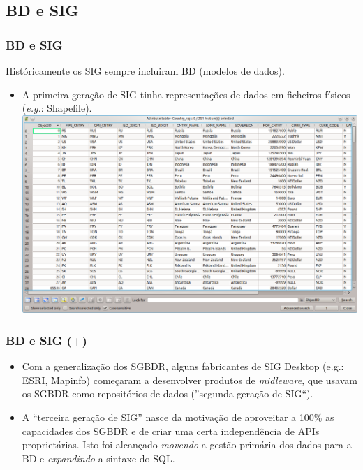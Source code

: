 \documentclass[hyperref={pdfpagelabels=true}]{beamer}
\begin{document}
\subsection{BD e SIG} 
\begin{frame}
\frametitle{BD e SIG}
Hist\'{o}ricamente os SIG sempre incluiram BD (modelos de dados).
    \begin{itemize}
      \item<2-> A primeira gera\c{c}\~{a}o de SIG tinha representa\c{c}\~{o}es de dados em ficheiros f\'{i}sicos (\textit{e.g.}: Shapefile).      
      \includegraphics[scale=0.2]{att_table.png}
      \end{itemize}
\end{frame}

\begin{frame}
\frametitle{BD e SIG (+)}
    \begin{itemize}
      \item<1-> Com a generaliza\c{c}\~{a}o dos SGBDR, alguns fabricantes de SIG Desktop (e.g.: ESRI, Mapinfo) come\c{c}aram a desenvolver produtos de \textit{midleware}, que usavam os SGBDR como reposit\'{o}rios de dados (''segunda gera\c{c}\~{a}o de SIG``).
      \item<2-> A ``terceira gera\c{c}\~{a}o de SIG'' nasce da motiva\c{c}\~{a}o de aproveitar a 100\% as capacidades dos SGBDR e de criar uma certa independ\^{e}ncia de APIs propriet\'{a}rias.
      Isto foi alcan\c{c}ado \textit{movendo} a gest\~{a}o prim\'{a}ria dos dados para a BD e \textit{expandindo} a sintaxe do SQL.
      \end{itemize}
\end{frame}
\end{document}
